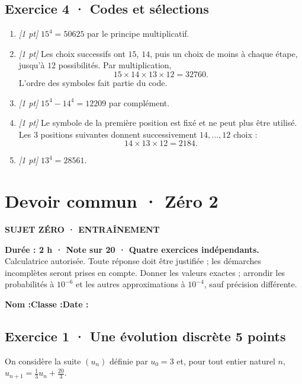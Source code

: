 \subsection*{Exercice 4 · Codes et sélections}\begin{enumerate}

\item \textit{[1 pt]} $15^4=50625$ par le principe multiplicatif.

\item \textit{[1 pt]} Les choix successifs ont $15$, $14$, puis un choix de moins à chaque étape, jusqu'à $12$ possibilités. Par multiplication,
\[15\times14\times13\times12=32760.\]
L'ordre des symboles fait partie du code.

\item \textit{[1 pt]} $15^4-14^4=12209$ par complément.

\item \textit{[1 pt]} Le symbole de la première position est fixé et ne peut plus être utilisé. Les $3$ positions suivantes donnent successivement $14,\ldots,12$ choix :
\[14\times13\times12=2184.\]

\item \textit{[1 pt]} $13^4=28561$.

\end{enumerate}

\fi

\mxnewpage{}\label{sujet:3-2}

\section*{Devoir commun · Zéro 2}

{\sffamily\bfseries\color{mxmint}SUJET ZÉRO · ENTRAÎNEMENT\par}

\textbf{Durée : 2 h · Note sur 20 · Quatre exercices indépendants.}\\Calculatrice autorisée. Toute réponse doit être justifiée ; les démarches incomplètes seront prises en compte. Donner les valeurs exactes ; arrondir les probabilités à $10^{-6}$ et les autres approximations à $10^{-4}$, sauf précision différente.

\smallskip\textbf{Nom :}\enspace\dotfill\quad\textbf{Classe :}\enspace\dotfill\quad\textbf{Date :}\enspace\dotfill

\subsection*{Exercice 1 · Une évolution discrète \hfill 5 points}On considère la suite $(u_n)$ définie par $u_0=3$ et, pour tout entier naturel $n$, $u_{n+1}=\frac{1}{3}u_n+\frac{20}{3}$.

